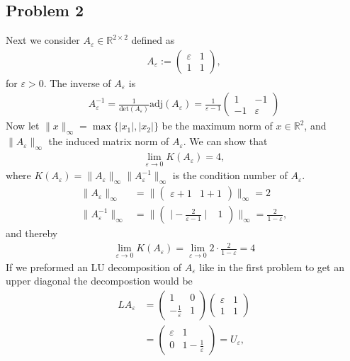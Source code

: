 \subsection{Problem 2}
Next we  consider $A_\varepsilon \in \mathbb{R}^{2 \times 2}$ defined as
\begin{align}
    A_\varepsilon :=
    \begin{pmatrix}
        \varepsilon & 1\\
        1 & 1
    \end{pmatrix},
\end{align}
for $\varepsilon > 0$. The inverse of $A_\varepsilon$ is
\begin{align}
    A_\varepsilon^{-1} = \frac{1}{\text{det}(A_\varepsilon)}
    \text{adj}(A_\varepsilon) =
    \frac{1}{\varepsilon - 1} \begin{pmatrix} 1 & -1 \\ -1 & \varepsilon \end{pmatrix}
\end{align}
Now let $\|x\|_\infty = \max\{|x_1|, |x_2|\}$ be the maximum norm of $x \in
\mathbb{R}^{2}$, and $\|A_\varepsilon\|_\infty$ the induced matrix norm of
$A_\varepsilon$. We can show that
\begin{align}
    \lim_{\varepsilon \to 0} K(A_\varepsilon) = 4,
\end{align}
where $K(A_\varepsilon) = \|A_\varepsilon\|_\infty
\|A_\varepsilon^{-1}\|_\infty$ is the condition number of $A_\varepsilon$.
\begin{align}
    \|A_\varepsilon\|_\infty &= \|\begin{pmatrix} \varepsilon + 1 & 1 + 1
    \end{pmatrix} \|_\infty = 2\\
    \|A_\varepsilon^{-1}\|_\infty &=
        \|\begin{pmatrix} \mid -\frac{2}{\varepsilon-1} \mid & 1 \end{pmatrix} \|_\infty
        = \frac{2}{1-\varepsilon},
\end{align}
and thereby
\begin{align}
    \lim_{\varepsilon \to 0} K(A_\varepsilon)=\lim_{\varepsilon \to 0} 2\cdot
    \frac{2}{1-\varepsilon} = 4
\end{align}
If we preformed an LU decomposition of $A_\varepsilon$ like in the first
problem to get an upper diagonal the decompostion would be
\begin{align}
    LA_\varepsilon &=
    \begin{pmatrix} 1 & 0 \\ -\frac{1}{\varepsilon} & 1 \end{pmatrix}
    \begin{pmatrix} \varepsilon & 1 \\ 1 & 1 \end{pmatrix} \\
        &=
    \begin{pmatrix} \varepsilon & 1 \\ 0 & 1 - \frac{1}{\varepsilon}
    \end{pmatrix} = U_\varepsilon,
\end{align}
